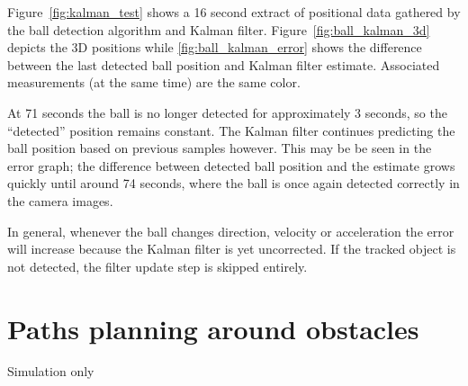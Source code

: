 Figure~\ref{fig:kalman_test} shows a 16 second extract of positional data gathered by the ball detection algorithm and Kalman filter.
Figure~\ref{fig:ball_kalman_3d} depicts the 3D positions while \ref{fig:ball_kalman_error} shows the difference between the last detected ball position and Kalman filter estimate. Associated measurements (at the same time) are the same color.

At 71 seconds the ball is no longer detected for approximately 3 seconds, so the ``detected'' position remains constant. The Kalman filter continues predicting the ball position based on previous samples however. This may be be seen in the error graph; the difference between detected ball position and the estimate grows quickly until around 74 seconds, where the ball is once again detected correctly in the camera images.

In general, whenever the ball changes direction, velocity or acceleration the error will increase because the Kalman filter is yet uncorrected. If the tracked object is not detected, the filter update step is skipped entirely.


\section{Paths planning around obstacles}
Simulation only



%         

%         

%             
%             

